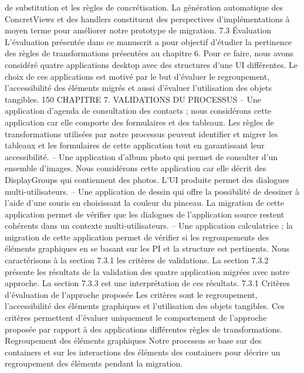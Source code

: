 \documentclass{article}
\begin{document}
de substitution et les r\`{e}gles de concr\'{e}tisation.
La g\'{e}n\'{e}ration automatique des ConcretViews et des handlers constituent des perspectives d’impl\'{e}mentations \`{a} moyen terme pour am\'{e}liorer notre prototype de migration.
7.3
Évaluation
L’\'{e}valuation pr\'{e}sent\'{e}e dans ce manuscrit a pour objectif d’\'{e}tudier la pertinence des r\`{e}gles de transformations pr\'{e}sent\'{e}es au chapitre 6. Pour ce faire, nous avons consid\'{e}r\'{e} quatre applications desktop
avec des structures d’une UI diff\'{e}rentes. Le choix de ces applications est motiv\'{e} par le but d’\'{e}valuer le
regroupement, l’accessibilit\'{e} des \'{e}l\'{e}ments migr\'{e}s et aussi d’\'{e}valuer l’utilisation des objets tangibles.
150
CHAPITRE 7. VALIDATIONS DU PROCESSUS
– Une application d’agenda de consultation des contacts ; nous consid\'{e}rons cette application car
elle comporte des formulaires et des tableaux. Les r\`{e}gles de transformations utilis\'{e}es par notre
processus peuvent identiﬁer et migrer les tableaux et les formulaires de cette application tout
en garantissant leur accessibilit\'{e}.
– Une application d’album photo qui permet de consulter d’un ensemble d’images. Nous consid\'{e}rons cette application car elle d\'{e}crit des DisplayGroups qui contiennent des photos. L’UI
produite permet des dialogues multi-utilisateurs.
– Une application de dessin qui offre la possibilit\'{e} de dessiner \`{a} l’aide d’une souris en choisissant
la couleur du pinceau. La migration de cette application permet de v\'{e}riﬁer que les dialogues de
l’application source restent coh\'{e}rents dans un contexte multi-utilisateurs.
– Une application calculatrice ; la migration de cette application permet de v\'{e}riﬁer si les regroupements des \'{e}l\'{e}ments graphiques en se basant sur les PI et la structure est pertinents.
Nous caract\'{e}risons \`{a} la section 7.3.1 les crit\`{e}res de validations. La section 7.3.2 pr\'{e}sente les
r\'{e}sultats de la validation des quatre application migr\'{e}es avec notre approche. La section 7.3.3 est une
interpr\'{e}tation de ces r\'{e}sultats.
7.3.1
Crit\`{e}res d’\'{e}valuation de l’approche propos\'{e}e
Les crit\`{e}res sont le regroupement, l’accessibilit\'{e} des \'{e}l\'{e}ments graphiques et l’utilisation des objets
tangibles. Ces crit\`{e}res permettent d’\'{e}valuer uniquement le comportement de l’approche propos\'{e}e par
rapport \`{a} des applications diff\'{e}rentes r\`{e}gles de transformations.
Regroupement des \'{e}l\'{e}ments graphiques
Notre processus se base sur des containers et sur les interactions des \'{e}l\'{e}ments des containers pour d\'{e}crire un regroupement des \'{e}l\'{e}ments pendant la migration.
\end{document}
